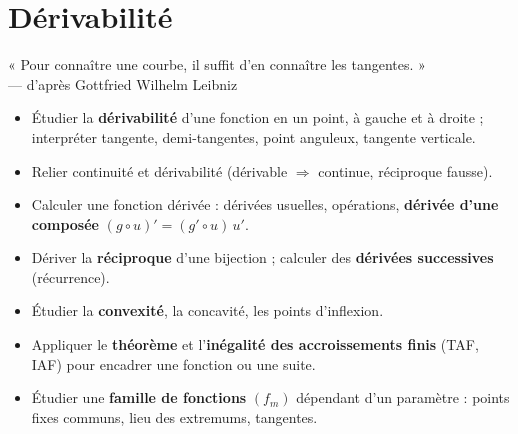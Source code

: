 
\chapter{Dérivabilité}

\begin{citationchapitre}
	« Pour connaître une courbe, il suffit d'en connaître les tangentes. »\\[0.4em]
	— d'après Gottfried Wilhelm Leibniz
\end{citationchapitre}

\begin{objectifs}
	\begin{itemize}[label=\textbullet]
		\item Étudier la \textbf{dérivabilité} d'une fonction en un point, à gauche
		et à droite ; interpréter tangente, demi-tangentes, point anguleux,
		tangente verticale.
		\item Relier continuité et dérivabilité (dérivable $\Rightarrow$ continue,
		réciproque fausse).
		\item Calculer une fonction dérivée : dérivées usuelles, opérations,
		\textbf{dérivée d'une composée} $(g\circ u)'=(g'\circ u)\,u'$.
		\item Dériver la \textbf{réciproque} d'une bijection ; calculer des
		\textbf{dérivées successives} (récurrence).
		\item Étudier la \textbf{convexité}, la concavité, les points d'inflexion.
		\item Appliquer le \textbf{théorème} et l'\textbf{inégalité des
		accroissements finis} (TAF, IAF) pour encadrer une fonction ou une suite.
		\item Étudier une \textbf{famille de fonctions} $(f_m)$ dépendant d'un
		paramètre : points fixes communs, lieu des extremums, tangentes.
	\end{itemize}
\end{objectifs}

